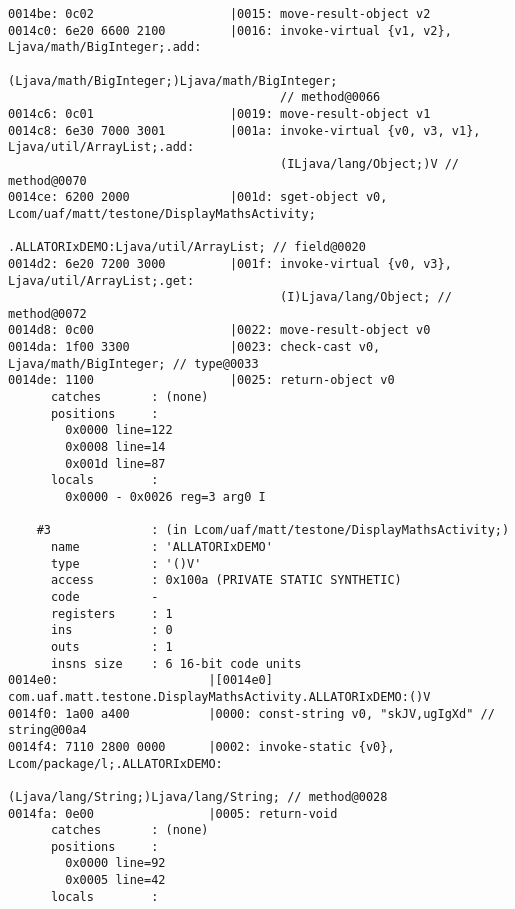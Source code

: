 \begin{lstlisting}
0014be: 0c02                   |0015: move-result-object v2
0014c0: 6e20 6600 2100         |0016: invoke-virtual {v1, v2}, Ljava/math/BigInteger;.add:
                                      (Ljava/math/BigInteger;)Ljava/math/BigInteger;
                                      // method@0066
0014c6: 0c01                   |0019: move-result-object v1
0014c8: 6e30 7000 3001         |001a: invoke-virtual {v0, v3, v1}, Ljava/util/ArrayList;.add:
                                      (ILjava/lang/Object;)V // method@0070
0014ce: 6200 2000              |001d: sget-object v0, Lcom/uaf/matt/testone/DisplayMathsActivity;
                                      .ALLATORIxDEMO:Ljava/util/ArrayList; // field@0020
0014d2: 6e20 7200 3000         |001f: invoke-virtual {v0, v3}, Ljava/util/ArrayList;.get:
                                      (I)Ljava/lang/Object; // method@0072
0014d8: 0c00                   |0022: move-result-object v0
0014da: 1f00 3300              |0023: check-cast v0, Ljava/math/BigInteger; // type@0033
0014de: 1100                   |0025: return-object v0
      catches       : (none)
      positions     :
        0x0000 line=122
        0x0008 line=14
        0x001d line=87
      locals        :
        0x0000 - 0x0026 reg=3 arg0 I

    #3              : (in Lcom/uaf/matt/testone/DisplayMathsActivity;)
      name          : 'ALLATORIxDEMO'
      type          : '()V'
      access        : 0x100a (PRIVATE STATIC SYNTHETIC)
      code          -
      registers     : 1
      ins           : 0
      outs          : 1
      insns size    : 6 16-bit code units
0014e0:                     |[0014e0] com.uaf.matt.testone.DisplayMathsActivity.ALLATORIxDEMO:()V
0014f0: 1a00 a400           |0000: const-string v0, "skJV,ugIgXd" // string@00a4
0014f4: 7110 2800 0000      |0002: invoke-static {v0}, Lcom/package/l;.ALLATORIxDEMO:
                                   (Ljava/lang/String;)Ljava/lang/String; // method@0028
0014fa: 0e00                |0005: return-void
      catches       : (none)
      positions     :
        0x0000 line=92
        0x0005 line=42
      locals        :


\end{lstlisting}
